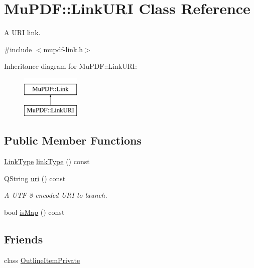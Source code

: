 \hypertarget{class_mu_p_d_f_1_1_link_u_r_i}{\section{Mu\-P\-D\-F\-:\-:Link\-U\-R\-I Class Reference}
\label{class_mu_p_d_f_1_1_link_u_r_i}
}


A U\-R\-I link.  




{\ttfamily \#include $<$mupdf-\/link.\-h$>$}

Inheritance diagram for Mu\-P\-D\-F\-:\-:Link\-U\-R\-I\-:\begin{figure}[H]
\begin{center}
\leavevmode
\includegraphics[height=2.000000cm]{class_mu_p_d_f_1_1_link_u_r_i}
\end{center}
\end{figure}
\subsection*{Public Member Functions}
\begin{DoxyCompactItemize}
\item 
\hyperlink{class_mu_p_d_f_1_1_link_afdc6828b6e00f323b53d6ae36d0d06b6}{Link\-Type} \hyperlink{class_mu_p_d_f_1_1_link_u_r_i_a32a9aea97620ed712100859e877597fe}{link\-Type} () const 
\item 
Q\-String \hyperlink{class_mu_p_d_f_1_1_link_u_r_i_a93ddf86fecab6a02abbcac0ef9a334d1}{uri} () const 
\begin{DoxyCompactList}\small\item\em A U\-T\-F-\/8 encoded U\-R\-I to launch. \end{DoxyCompactList}\item 
bool \hyperlink{class_mu_p_d_f_1_1_link_u_r_i_a6b567bf241449131f7ac5aafbcdd14cc}{is\-Map} () const 
\end{DoxyCompactItemize}
\subsection*{Friends}
\begin{DoxyCompactItemize}
\item 
class \hyperlink{class_mu_p_d_f_1_1_link_u_r_i_ab008ed670017e41b6e6bba8707c775d2}{Outline\-Item\-Private}
\end{DoxyCompactItemize}
